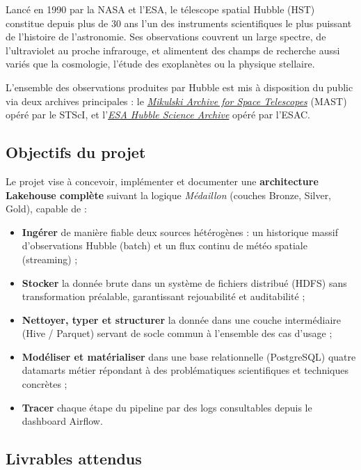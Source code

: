 \documentclass[11pt,a4paper]{article}
\begin{document}
Lancé en 1990 par la NASA et l'ESA, le télescope spatial Hubble (HST) constitue depuis plus de 30 ans l'un des instruments scientifiques le plus puissant de l'histoire de l'astronomie. Ses observations couvrent un large spectre, de l'ultraviolet au proche infrarouge, et alimentent des champs de recherche aussi variés que la cosmologie, l'étude des exoplanètes ou la physique stellaire.

L'ensemble des observations produites par Hubble est mis à disposition du public via deux archives principales : le \href{https://mast.stsci.edu/portal/Mashup/Clients/Mast/Portal.html}{\textit{Mikulski Archive for Space Telescopes}} (MAST) opéré par le STScI, et l'\href{https://www.cosmos.esa.int/web/hst/fetching-data}{\textit{ESA Hubble Science Archive}} opéré par l'ESAC.

\subsection{Objectifs du projet}

Le projet vise à concevoir, implémenter et documenter une \textbf{architecture Lakehouse complète} suivant la logique \textit{Médaillon} (couches Bronze, Silver, Gold), capable de :

\begin{itemize}
    \item \textbf{Ingérer} de manière fiable deux sources hétérogènes : un historique massif d'observations Hubble (batch) et un flux continu de météo spatiale (streaming) ;
    \item \textbf{Stocker} la donnée brute dans un système de fichiers distribué (HDFS) sans transformation préalable, garantissant rejouabilité et auditabilité ;
    \item \textbf{Nettoyer, typer et structurer} la donnée dans une couche intermédiaire (Hive / Parquet) servant de socle commun à l'ensemble des cas d'usage ;
    \item \textbf{Modéliser et matérialiser} dans une base relationnelle (PostgreSQL) quatre datamarts métier répondant à des problématiques scientifiques et techniques concrètes ;
    \item \textbf{Tracer} chaque étape du pipeline par des logs consultables depuis le dashboard Airflow.
\end{itemize}

\subsection{Livrables attendus}
\end{document}
